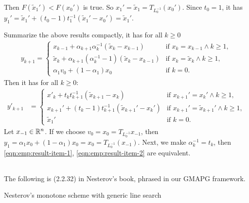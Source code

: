 \documentclass[12pt]{report}
\begin{document}
\begin{example}
            Then $F(\tilde x_1') < F(x_0')$ is true. 
            So $x_1' = \tilde x_1 = T_{L_0^{-1}}(x_0')$. 
            Since $t_0 = 1$, it has $y_1' =\tilde x_1' + (t_0 - 1)t_1^{-1}(\tilde x_1' - x_0')= \tilde x_1'$. 
            \par
            Summarize the above results compactly, it has for all $k \ge 0$
            \begin{align}\label{eqn:emp:result-item-1}
                y_{k + 1} = \begin{cases}
                    x_{k - 1} + \alpha_{k + 1}\alpha_k^{-1}(\tilde x_k - x_{k - 1})
                    & \text{if } x_k = x_{k - 1} \wedge k \ge 1,
                    \\
                    \tilde x_k + \alpha_{k + 1}(\alpha_k^{-1} - 1)(\tilde x_k - x_{k - 1})
                    & \text{if } x_k = \tilde x_k \wedge k \ge 1,
                    \\
                    \alpha_1v_0 + (1 - \alpha_1)x_0 & \text{if } k = 0. 
                \end{cases}
            \end{align}
            Then it has for all $k \ge 0$: 
            \begin{align}\label{eqn:emp:result-item-2}
                y'_{k + 1} &= 
                \begin{cases}
                    x'_k + t_kt_{k + 1}^{-1}(\tilde x_{k + 1} - x_k) 
                    & \text{if } x_{k + 1}' = x_k' \wedge k \ge 1,
                    \\
                    x_{k + 1}' + (t_k - 1)t_{k + 1}^{-1}(\tilde x_{k + 1}' - x_k')  
                    & \text{if } x_{k + 1}' = \tilde x_{k + 1}'\wedge k \ge 1, 
                    \\
                    \tilde x_1'
                    & 
                    \text{if } k = 0. 
                \end{cases}
            \end{align}
            Let $x_{-1} \in \mathbb R^n$. 
            If we choose $v_0 = x_0 = T_{L_0^{-1}} x_{-1}$, then $y_1 = \alpha_1 x_0 + (1 - \alpha_1)x_0 = x_0 = T_{L_0^{-1}}(x_{-1})$.
            Next, we make $\alpha_k^{-1} = t_k$, then \eqref{eqn:emp:result-item-1}, \eqref{eqn:emp:result-item-2} are equivalent. 
        \end{example}
        \begin{example}\;\\
            The following is (2.2.32) in Nesterov's book, phrased in our GMAPG framework. 
            \begin{algorithm}\label{alg:nesterov-mono-generic-ls}
            \begin{algorithmic}[1]
            \end{algorithmic}\caption{Nesterov's monotone scheme with generic line search}
            \end{algorithm}
        \end{example}
\end{document}
